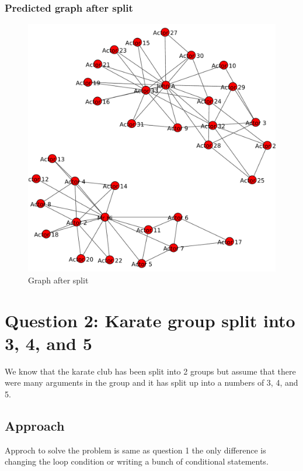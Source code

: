 \documentclass[12pt]{article}
\begin{document}
\subsubsection{Predicted graph after split}
\begin{figure}[ht]
\includegraphics[scale=0.7]{../Q1/graph2.pdf}
\centering
\caption{Graph after split}
\label{fig:Graph after split}
\end{figure}
\newpage


\section{Question 2: Karate group split into 3, 4, and 5}
We know that the karate club has been split into 2 groups but assume that there were many arguments in the group and it has split up into a numbers of 3, 4, and 5.
\subsection{Approach}
Approch to solve the problem is same as question 1 the only difference is  changing the loop condition or writing a bunch of conditional statements.
\end{document}
